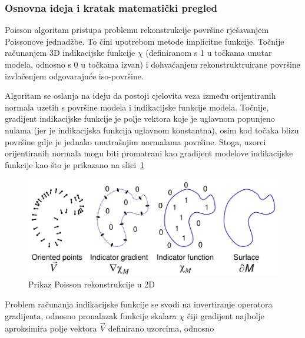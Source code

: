 

\subsubsection{Osnovna ideja i kratak matematički pregled} %
\label{ssub:Osnovna ideja i kratak matematički pregled}

Poisson algoritam pristupa problemu rekonstrukcije površine rješavanjem
Poissonove jednadžbe. To čini upotrebom metode implicitne funkcije.
Točnije računanjem 3D indikacijske funkcije \(\chi\) (definiranom s 1 u
točkama unutar modela, odnosno s 0 u točkama izvan) i dohvaćanjem
rekonstruktruirane površine izvlačenjem odgovarajuće iso-površine.

Algoritam se oslanja na ideju da postoji cjelovita veza između
orijentiranih normala uzetih s površine modela i indikacijske funkcije
modela. Točnije, gradijent indikacijske funkcije je polje vektora koje
je uglavnom popunjeno nulama (jer je indikacijska funkcija uglavnom
konstantna), osim kod točaka blizu površine gdje je jednako unutrašnjim
normalama površine. Stoga, uzorci orijentiranih normala mogu biti
promatrani kao gradijent modelove indikacijske funkcije kao što je
prikazano na slici~\ref{fig:poisson-reconstruction.png}

\begin{figure}[h]
\centering
\includegraphics[scale=0.35]{figures/poisson-reconstruction.png}
\caption{Prikaz Poisson rekonstrukcije u 2D}
\label{fig:poisson-reconstruction.png}
\end{figure}

Problem računanja indikacijske funkcije se svodi na invertiranje
operatora gradijenta, odnosno pronalazak funkcije skalara \(\chi\) čiji
gradijent najbolje aproksimira polje vektora \(\vec{V}\) definirano
uzorcima, odnosno 

